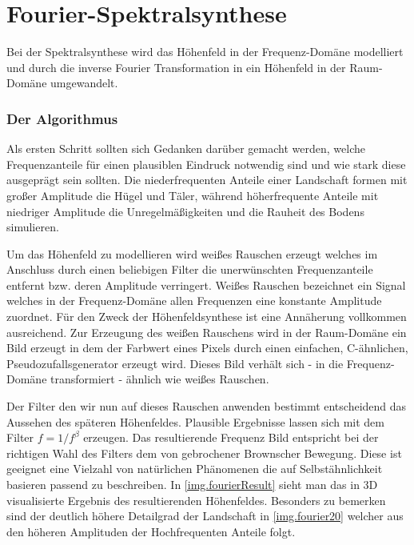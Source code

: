 \chapter{Fourier-Spektralsynthese}
Bei der Spektralsynthese wird das Höhenfeld in der Frequenz-Domäne modelliert und durch die inverse Fourier Transformation in ein Höhenfeld in der Raum-Domäne umgewandelt. 

\subsection{Der Algorithmus}
Als ersten Schritt sollten sich Gedanken darüber gemacht werden, welche Frequenzanteile für einen plausiblen Eindruck notwendig sind und wie stark diese ausgeprägt sein sollten. Die niederfrequenten Anteile einer Landschaft formen mit großer Amplitude die Hügel und Täler, während höherfrequente Anteile mit niedriger Amplitude die Unregelmäßigkeiten und die Rauheit des Bodens simulieren.

Um das Höhenfeld zu modellieren wird weißes Rauschen erzeugt welches im Anschluss durch einen beliebigen Filter die unerwünschten Frequenzanteile entfernt bzw. deren Amplitude verringert.
Weißes Rauschen bezeichnet ein Signal welches in der Frequenz-Domäne allen Frequenzen eine konstante Amplitude zuordnet\cite{whiteNoise}. Für den Zweck der Höhenfeldsynthese ist eine Annäherung vollkommen ausreichend. Zur Erzeugung des weißen Rauschens wird in der Raum-Domäne ein Bild erzeugt in dem der Farbwert eines Pixels durch einen einfachen, C-ähnlichen, Pseudozufallsgenerator erzeugt wird\label{fourier.rauschbild}. Dieses Bild verhält sich - in die Frequenz-Domäne transformiert - ähnlich wie weißes Rauschen.

Der Filter den wir nun auf dieses Rauschen anwenden bestimmt entscheidend das Aussehen des späteren Höhenfeldes. Plausible Ergebnisse lassen sich mit dem Filter $f=1/f^\beta$
erzeugen. Das resultierende Frequenz Bild entspricht bei der richtigen Wahl des Filters dem von gebrochener Brownscher Bewegung\cite{fbmFromFourier}. Diese ist geeignet eine Vielzahl von natürlichen Phänomenen die auf Selbstähnlichkeit basieren passend zu beschreiben\cite{fbm}.
In \autoref{img.fourierResult} sieht man das in 3D visualisierte Ergebnis des resultierenden Höhenfeldes. Besonders zu bemerken sind der deutlich höhere Detailgrad der Landschaft in \autoref{img.fourier20} welcher aus den höheren Amplituden der Hochfrequenten Anteile folgt.

